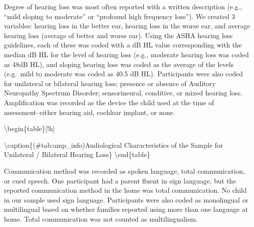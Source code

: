 \documentclass[english,man,floatsintext]{apa6}
\begin{document}
Degree of hearing loss was most often reported with a written description (e.g., \enquote{mild sloping to moderate} or \enquote{profound high frequency loss}). We created 3 variables: hearing loss in the better ear, hearing loss in the worse ear, and average hearing loss (average of better and worse ear). Using the ASHA hearing loss guidelines, each of these was coded with a dB HL value corresponding with the median dB HL for the level of hearing loss (e.g., moderate hearing loss was coded as 48dB HL), and sloping hearing loss was coded as the average of the levels (e.g.~mild to moderate was coded as 40.5 dB HL). Participants were also coded for unilateral or bilateral hearing loss; presence or absence of Auditory Neuropathy Spectrum Disorder; sensorineural, conditive, or mixed hearing loss. Amplification was recorded as the device the child used at the time of assessment--either hearing aid, cochlear implant, or none.

\textbackslash{}begin\{table\}{[}!h{]}

\textbackslash{}caption\{(\#tab:amp\_info)Audiological Characteristics of the Sample
for Unilateral / Bilateral Hearing Loss\}
\centering
{}
\textbackslash{}end\{table\}

Communication method was recorded as spoken language, total communication, or cued speech. One participant had a parent fluent in sign language, but the reported communication method in the home was total communication. No child in our sample used sign language. Participants were also coded as monolingual or multilingual based on whether families reported using more than one language at home. Total communication was not counted as multilingualism.
\end{document}
